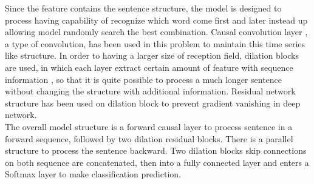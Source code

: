 Since the feature contains the sentence structure, the model is designed to
process having capability of recognize which word come first and later instead
up allowing model randomly search the best combination. Causal convolution layer
\cite{oord2016pixel}, a type of convolution, has been used in this problem to
maintain this time series like structure. In order to having a larger size of
reception field, dilation blocks are used, in which each layer extract certain
amount of feature with sequence information \cite{van2016wavenet}, so that it is
quite possible to process a much longer sentence without changing the structure
with additional information. Residual network structure \cite{he2016deep} has
been used on dilation block to prevent gradient vanishing in deep network. \\ 
The overall model structure is a forward causal layer to process sentence in a
forward sequence, followed by two dilation residual blocks. There is a parallel
structure to process the sentence backward. Two dilation blocks skip connections
on both sequence are concatenated, then into a fully connected layer and enters
a Softmax layer to make classification prediction.

